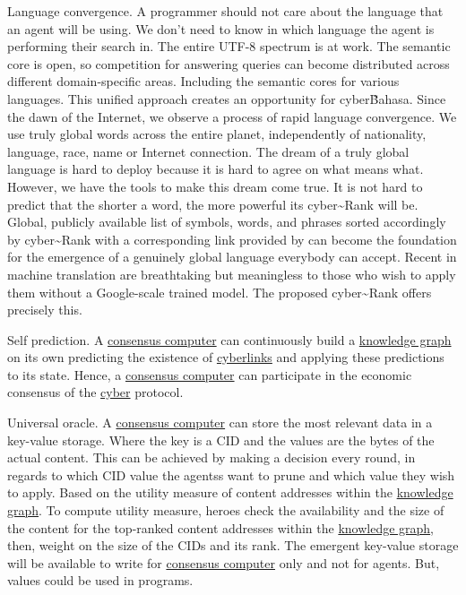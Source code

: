 \documentclass[8pt,oneside]{amsart}
\newcommand{\linkred}[2]{\href{#1}{\color{red}{#2}}}
\newcommand{\linkgreen}[2]{\href{#1}{\color{green}{#2}}}
\begin{document}
Language convergence. A programmer should not care about the language that an agent will be using. We don't need to know in which language the agent is performing their search in. The entire UTF-8 spectrum is at work. The semantic core is open, so competition for answering queries can become distributed across different domain-specific areas. Including the semantic cores for various languages. This unified approach creates an opportunity for cyber\~Bahasa. Since the dawn of the Internet, we observe a process of rapid language convergence. We use truly global words across the entire planet, independently of nationality, language, race, name or Internet connection. The dream of a truly global language is hard to deploy because it is hard to agree on what means what. However, we have the tools to make this dream come true. It is not hard to predict that the shorter a word, the more powerful its cyber\~{}Rank will be. Global, publicly available list of symbols, words, and phrases sorted accordingly by cyber\~{}Rank with a corresponding link provided by \linkred{https://github.com/cybercongress/go-cyber}{go-cyber} can become the foundation for the emergence of a genuinely global language everybody can accept. Recent \linkgreen{https://ipfs.io/ipfs/QmQUWBhDMfPKgFt3NfbxM1VU22oU8CRepUzGPBDtopwap1}{scientific advances} in machine translation are breathtaking but meaningless to those who wish to apply them without a Google-scale trained model. The proposed cyber\~{}Rank offers precisely this.

Self prediction. A {\hyperref[consensus-computer]{consensus computer}} can continuously build a {\hyperref[knowledge-graph]{knowledge graph}} on its own predicting the existence of {\hyperref[cyberlinks]{cyberlinks}} and applying these predictions to its state. Hence, a {\hyperref[consensus-computer]{consensus computer}} can participate in the economic consensus of the {\hyperref[cyber]{cyber}} protocol.

Universal oracle. A {\hyperref[consensus-computer]{consensus computer}} can store the most relevant data in a key-value storage. Where the key is a CID and the values are the bytes of the actual content. This can be achieved by making a decision every round, in regards to which CID value the agentss want to prune and which value they wish to apply. Based on the utility measure of content addresses within the {\hyperref[knowledge-graph]{knowledge graph}}. To compute utility measure, heroes check the availability and the size of the content for the top-ranked content addresses within the {\hyperref[knowledge-graph]{knowledge graph}}, then, weight on the size of the CIDs and its rank. The emergent key-value storage will be available to write for {\hyperref[consensus-computer]{consensus computer}} only and not for agents. But, values could be used in programs.
\end{document}
